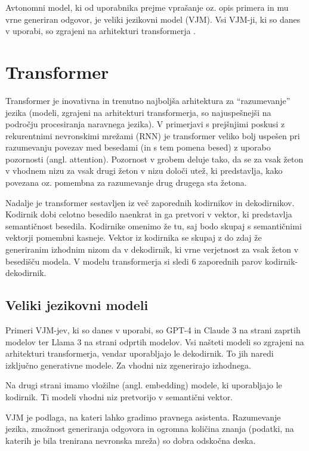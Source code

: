 \documentclass[a4paper,12pt,openright]{book}
\begin{document}
Avtonomni model, ki od uporabnika prejme vprašanje oz. opis primera in mu vrne generiran odgovor, je veliki jezikovni model (VJM). Vsi VJM-ji, ki so danes v uporabi, so zgrajeni na arhitekturi transformerja \cite{transformer}.

\section{Transformer}

Transformer je inovativna in trenutno najboljša arhitektura za “razumevanje” jezika (modeli, zgrajeni na arhitekturi transformerja, so najuspešnejši na področju procesiranja naravnega jezika). V primerjavi s prejšnjimi poskusi z rekurentnimi nevronskimi mrežami (RNN) je transformer veliko bolj uspešen pri razumevanju povezav med besedami (in s tem pomena besed) z uporabo pozornosti (angl. attention). Pozornost v grobem deluje tako, da se za vsak žeton v vhodnem nizu za vsak drugi žeton v nizu določi utež, ki predstavlja, kako povezana oz. pomembna za razumevanje drug drugega sta žetona.

Nadalje je transformer sestavljen iz več zaporednih kodirnikov in dekodirnikov. Kodirnik dobi celotno besedilo naenkrat in ga pretvori v vektor, ki predstavlja semantičnost besedila. Kodirnike omenimo že tu, saj bodo skupaj s semantičnimi vektorji pomembni kasneje. Vektor iz kodirnika se skupaj z do zdaj že generiranim izhodnim nizom da v dekodirnik, ki vrne verjetnost za vsak žeton v besedišču modela. V modelu transformerja si sledi 6 zaporednih parov kodirnik-dekodirnik.

\subsection{Veliki jezikovni modeli}

Primeri VJM-jev, ki so danes v uporabi, so GPT-4 \cite{gpt4} in Claude 3 \cite{claude3} na strani zaprtih modelov ter Llama 3 \cite{llama3} na strani odprtih modelov. Vsi našteti modeli so zgrajeni na arhitekturi transformerja, vendar uporabljajo le dekodirnik. To jih naredi izključno generativne modele. Za vhodni niz zgenerirajo izhodnega.

Na drugi strani imamo vložilne (angl. embedding) modele, ki uporabljajo le kodirnik. Ti modeli vhodni niz pretvorijo v semantični vektor.

VJM je podlaga, na kateri lahko gradimo pravnega asistenta. Razumevanje jezika, zmožnost generiranja odgovora in ogromna količina znanja (podatki, na katerih je bila trenirana nevronska mreža) so dobra odskočna deska.
\end{document}
